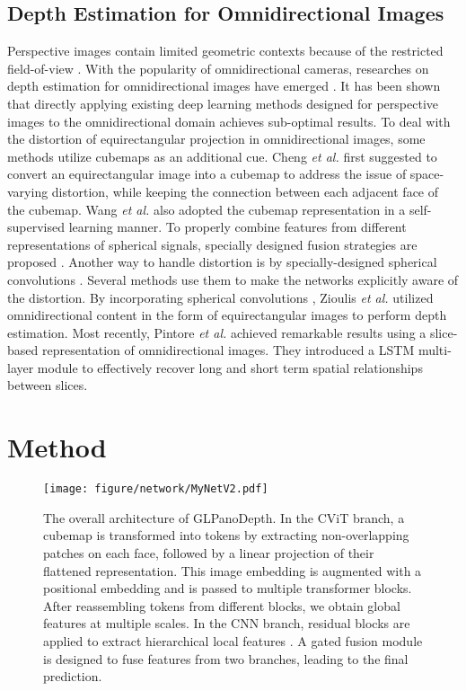 \documentclass[10pt,twocolumn,letterpaper]{article}
\begin{document}
\subsection{Depth Estimation for Omnidirectional Images}
Perspective images contain limited geometric contexts because of the restricted field-of-view \cite{10.1007/978-3-319-10599-4_43}. With the popularity of omnidirectional cameras, researches on depth estimation for omnidirectional images have emerged \cite{Wang_2019_ICRA,Zou_2018_CVPR,10.1007/978-3-319-10599-4_43}. It has been shown that directly applying existing deep learning methods designed for perspective images to the omnidirectional domain achieves sub-optimal results.
To deal with the distortion of equirectangular projection in omnidirectional images, some methods utilize cubemaps as an additional cue. Cheng \emph{et al.} \cite{Cheng_2018_CVPR} first suggested to convert an equirectangular image into a cubemap to address the issue of space-varying distortion, while keeping the connection between each adjacent face of the cubemap. Wang \emph{et al.} \cite{Wang_2018_ACCV} also adopted the cubemap representation in a self-supervised learning manner. To properly combine features from different representations of spherical signals, specially designed fusion strategies are proposed \cite{9157424,9353978}. Another way to handle distortion is by specially-designed spherical convolutions \cite{NIPS2017_0c74b7f7,Su_2019_CVPR,s.2018spherical,10.1007/978-3-030-01240-3_32}. Several methods use them to make the networks explicitly aware of the distortion. By incorporating spherical convolutions \cite{NIPS2017_0c74b7f7}, Zioulis \emph{et al.} \cite{3D60} utilized omnidirectional content in the form of equirectangular images to perform depth estimation. Most recently, Pintore \emph{et al.} \cite{Pintore_2021_CVPR} achieved remarkable results using a slice-based representation of omnidirectional images. They introduced a LSTM multi-layer module \cite{10.5555/2969239.2969329} to effectively recover long and short term spatial relationships between slices. 




\section{Method}
\begin{figure*}[t]
  \centering
  
   \texttt{[image: figure/network/MyNetV2.pdf]}

   \caption{The overall architecture of GLPanoDepth. In the CViT branch, a cubemap is transformed into tokens by extracting non-overlapping patches on each face, followed by a linear projection of their flattened representation. This image embedding is augmented with a positional embedding and is passed to multiple transformer blocks. After reassembling tokens from different blocks, we obtain global features  at multiple scales. In the CNN branch, residual blocks are applied to extract hierarchical local features . A gated fusion module is designed to fuse features from two branches, leading to the final prediction.}
   \label{fig:network}
\end{figure*}
\end{document}
